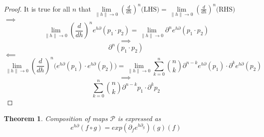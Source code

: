 \documentclass{article}
\newcommand{\dP}{\mathcal{P}}
\newcommand{\D}{\partial}
\newtheorem{izrek}{Theorem}[section]
\begin{document}
 \begin{proof}
 It is true for all $n$ that $\lim\limits_{\lVert h\rVert\to 0}(\frac{d}{dh})^n\text{(LHS)}=\lim\limits_{\lVert h\rVert\to 0}(\frac{d}{dh})^n\text{(RHS)}$\\
  $\implies$
  $$\lim\limits_{\lVert h\rVert\to 0}(\frac{d}{dh})^ne^{h\D}(p_1\cdot p_2)=\lim\limits_{\lVert h\rVert\to 0}\D^ne^{h\D}(p_1\cdot p_2)$$
  $$\implies$$
  $$\D^n(p_1\cdot p_2)$$
  $\impliedby$
  $$\lim\limits_{\lVert h\rVert\to 0}(\frac{d}{dh})^n\Big(e^{h\D}(p_1)\cdot e^{h\D}(p_2)\Big)=\lim\limits_{\lVert h\rVert\to 0}\sum\limits_{k=0}^{n}{n\choose k}\D^{n-k}e^{h\D}(p_1)\cdot \D^ke^{h\D}(p_2)$$
  $$\implies$$
  $$\sum\limits_{k=0}^{n}{n\choose k}\D^{n-k}p_1\cdot \D^kp_2$$
 \end{proof}
 
 \begin{izrek}\label{izr:kompo}
 Composition of maps $\dP$ is expressed as
 \begin{equation}\label{eq:kompo}
 e^{h\D}(f\circ g)=exp(\D_fe^{h\D_g})(g)(f)
 \end{equation}
 \end{izrek}
 
\end{document}
